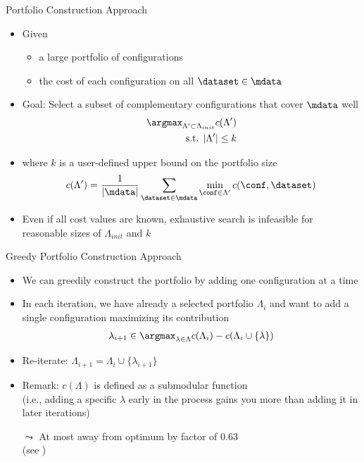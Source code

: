 \begin{frame}[c]{Portfolio Construction Approach}

\begin{itemize}
	\item Given
	\begin{itemize}
		\item a large portfolio of configurations
		\item the cost of each configuration on all $\dataset \in \mdata$ 
	\end{itemize} 
	\pause
	\item Goal: Select a subset of complementary configurations that cover $\mdata$ well
	\begin{eqnarray}
	\argmax_{\Lambda' \subset \Lambda_{init}} c(\Lambda')\nonumber\\
	\text{s.t. } |\Lambda'| \leq k \nonumber 
	\end{eqnarray}
	\item where $k$ is a user-defined upper bound on the portfolio size
	\pause
$$		c(\Lambda') = \frac{1}{|\mdata|} \sum_{\dataset \in \mdata} \min_{\conf \in \Lambda'} c(\conf, \dataset) $$
	\pause
	\medskip
	\item Even if all cost values are known, exhaustive search is infeasible for reasonable sizes of $\Lambda_{init}$ and $k$
\end{itemize}


\end{frame}
\begin{frame}[c]{Greedy Portfolio Construction Approach}

\begin{itemize}
	\item We can greedily construct the portfolio by adding one configuration at a time
	\pause
	\item In each iteration, we have already a selected portfolio $\Lambda_i$ and want to add a single configuration maximizing its contribution
	\begin{eqnarray}
	\lambda_{i+1} \in \argmax_{\lambda \in \Lambda} c(\Lambda_i) - c(\Lambda_i \cup \{\lambda\})
	\end{eqnarray}
	\item Re-iterate: $\Lambda_{i+1} = \Lambda_i \cup \{\lambda_{i+1}\}$
	\pause
	\medskip
	\item \alert{Remark}: $c(\Lambda)$ is defined as a \alert{submodular} function\\
	(i.e., adding a specific $\lambda$ early in the process gains you more than adding it in later iterations)
	\item[$\leadsto$] At most away from optimum by factor of $0.63$\\ (see )
\end{itemize}


\end{frame}

